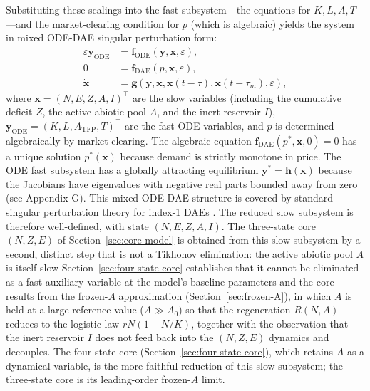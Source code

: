 \documentclass[twocolumn,10pt]{article}
\begin{document}
Substituting these scalings into the fast subsystem---the equations for \(K, L, A, T\)---and the market-clearing condition for \(p\) (which is algebraic) yields the system in mixed ODE-DAE singular perturbation form:
\begin{align}
\varepsilon \dot{\mathbf{y}}_{\text{ODE}} &= \mathbf{f}_{\text{ODE}}(\mathbf{y}, \mathbf{x}, \varepsilon), \label{eq:fast-ode} \\
0 &= \mathbf{f}_{\text{DAE}}(p, \mathbf{x}, \varepsilon), \label{eq:fast-dae} \\
\dot{\mathbf{x}} &= \mathbf{g}(\mathbf{y}, \mathbf{x}, \mathbf{x}(t-\tau), \mathbf{x}(t-\tau_m), \varepsilon), \label{eq:slow-subsystem}
\end{align}
where \(\mathbf{x} = (N, E, Z, A, I)^\top\) are the slow variables (including the cumulative deficit \(Z\), the active abiotic pool \(A\), and the inert reservoir \(I\)), \(\mathbf{y}_{\text{ODE}} = (K, L, A_{\text{TFP}}, T)^\top\) are the fast ODE variables, and \(p\) is determined algebraically by market clearing. The algebraic equation \(\mathbf{f}_{\text{DAE}}(p^*, \mathbf{x}, 0) = 0\) has a unique solution \(p^*(\mathbf{x})\) because demand is strictly monotone in price. The ODE fast subsystem has a globally attracting equilibrium \(\mathbf{y}^* = \mathbf{h}(\mathbf{x})\) because the Jacobians have eigenvalues with negative real parts bounded away from zero (see Appendix G). This mixed ODE-DAE structure is covered by standard singular perturbation theory for index-1 DAEs \cite{hairer1996}. The reduced slow subsystem is therefore well-defined, with state \((N,E,Z,A,I)\). The three-state core \((N,Z,E)\) of Section~\ref{sec:core-model} is obtained from this slow subsystem by a second, distinct step that is not a Tikhonov elimination: the active abiotic pool \(A\) is itself slow \textemdash{} Section~\ref{sec:four-state-core} establishes that it cannot be eliminated as a fast auxiliary variable at the model's baseline parameters \textemdash{} and the core results from the frozen-\(A\) approximation (Section~\ref{sec:frozen-A}), in which \(A\) is held at a large reference value (\(A\gg A_0\)) so that the regeneration \(R(N,A)\) reduces to the logistic law \(rN(1-N/K)\), together with the observation that the inert reservoir \(I\) does not feed back into the \((N,Z,E)\) dynamics and decouples. The four-state core (Section~\ref{sec:four-state-core}), which retains \(A\) as a dynamical variable, is the more faithful reduction of this slow subsystem; the three-state core is its leading-order frozen-\(A\) limit.
\end{document}

